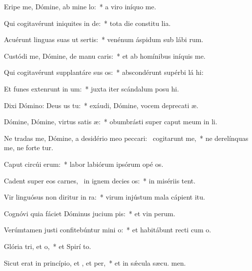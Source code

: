 \item Eripe me, Dómine, ab mine lo:~* a viro iníquo  me.
\item Qui cogitavérunt iniquites in de:~* tota die constitu lia.
\item Acuérunt linguas suas ut sertis:~* venénum áspidum sub lábi rum.
\item Custódi me, Dómine, de manu caris:~* et ab homínibus iníquis  me.
\item Qui cogitavérunt supplantáre sus os:~* abscondérunt supérbi lá hi:
\item Et funes extenrunt in um:~* juxta iter scándalum posu hi.
\item Dixi Dómino: Deus us  tu:~* exáudi, Dómine, vocem deprecati æ.
\item Dómine, Dómine, virtus satis æ:~* obumbrásti super caput meum in  li.
\item Ne tradas me, Dómine, a desidério meo peccari:~\pscross{} cogitarunt  me,~* ne derelínquas me, ne forte tur.
\item Caput circúi erum:~* labor labiórum ipsórum opé os.
\item Cadent super eos carnes,~\pscross{} in ignem decies os:~* in misériis  tent.
\item Vir linguósus non diritur in ra:~* virum injústum mala cápient  itu.
\item Cognóvi quia fáciet Dóminus jucium pis:~* et vin perum.
\item Verúmtamen justi confitebúntur mini o:~* et habitábunt recti cum  o.
\item Glória tri, et o,~* et Spirí to.
\item Sicut erat in princípio, et , et per,~* et in sǽcula sæcu. men.
